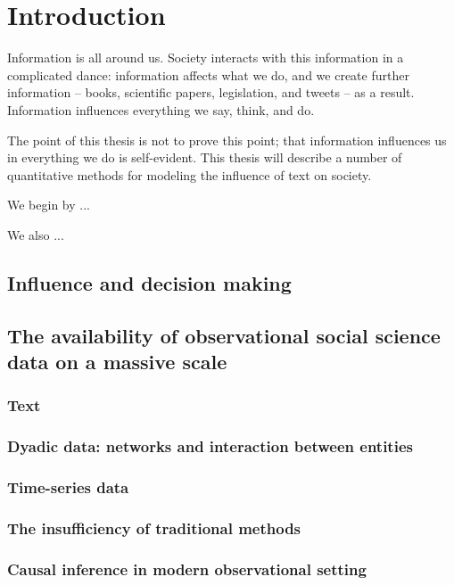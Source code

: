 \chapter{Introduction}


Information is all around us.  Society interacts with this information
in a complicated dance: information affects what we do, and we create
further information -- books, scientific papers, legislation, and
tweets -- as a result.  Information influences everything we say,
think, and do.

The point of this thesis is not to prove this point; that information
influences us in everything we do is self-evident.  This thesis will
describe a number of quantitative methods for modeling the influence of text on society.

We begin by ...

We also ...

\section{Influence and decision making}

\section{The availability of observational social science data on a massive scale}

\subsection{Text}

\subsection{Dyadic data: networks and interaction between entities}

\subsection{Time-series data}

\subsection{The insufficiency of traditional methods}

\subsection{Causal inference in modern observational setting}

